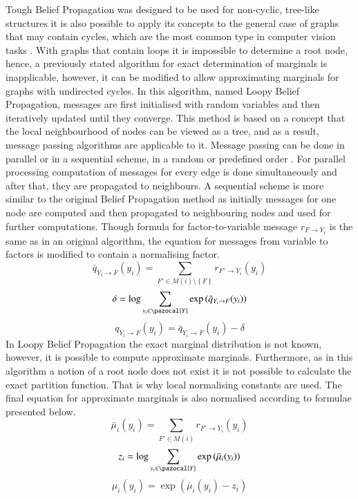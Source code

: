 Tough Belief Propagation was designed to be used for non-cyclic, tree-like structures it is also possible to apply its concepts to the general case of graphs that may contain cycles, which are the most common type in computer vision tasks \cite{lbp_byung}. With graphs that contain loops it is impossible to determine a root node, hence, a previously stated algorithm for exact determination of marginals is inapplicable, however, it can be modified to allow approximating marginals for graphs with undirected cycles. In this algorithm, named Loopy Belief Propagation, messages are first initialised with random variables and then iteratively updated until they converge. This method is based on a concept that the local neighbourhood of nodes can be viewed as a tree, and as a result, message passing algorithms are applicable to it. Message passing can be done in parallel or in a sequential scheme, in a random or predefined order \cite{MRFSurvey}. For parallel processing computation of messages for every edge is done simultaneously and after that, they are propagated to neighbours. A sequential scheme is more similar to the original Belief Propagation method as initially messages for one node are computed and then propagated to neighbouring nodes and used for further computations. Though formula for factor-to-variable message $r_{F\rightarrow Y_i}$ is the same as in an original algorithm, the equation for messages from variable to factors is modified to contain a normalising factor. 
\begin{equation}
    \bar{q}_{Y_i\rightarrow F}(y_i) = \sum_{F' \in M(i) \setminus \left \{ F \right \} }{ r_{F' \rightarrow Y_i}(y_i)}
\end{equation}
\begin{equation}
    \delta = \log{\sum_{y_i \in \pazocal{Y}}{\exp{( \bar{q}_{Y_i\rightarrow F}(y_i)})}}
\end{equation}
\begin{equation}
    q_{Y_i\rightarrow F}(y_i) = \bar{q}_{Y_i\rightarrow F}(y_i) - \delta
\end{equation}
In Loopy Belief Propagation the exact marginal distribution is not known, however, it is possible to compute approximate marginals. Furthermore, as in this algorithm a notion of a root node does not exist it is not possible to calculate the exact partition function. That is why local normalising constants are used. The final equation for approximate marginals is also normalised according to formulae presented below.
\begin{equation}
    \bar{\mu}_i (y_i) = \sum_{F' \in M(i)}{r_{F'\rightarrow Y_i}(y_i)}
\end{equation}
\begin{equation}
    z_i = \log{\sum_{y_i \in \pazocal{Y}}{\exp{( \bar{\mu}_i (y_i))}}}
\end{equation}
\begin{equation}
   \mu_i (y_i) = \exp{(\bar{\mu}_i (y_i) - z_i)}
\end{equation}

